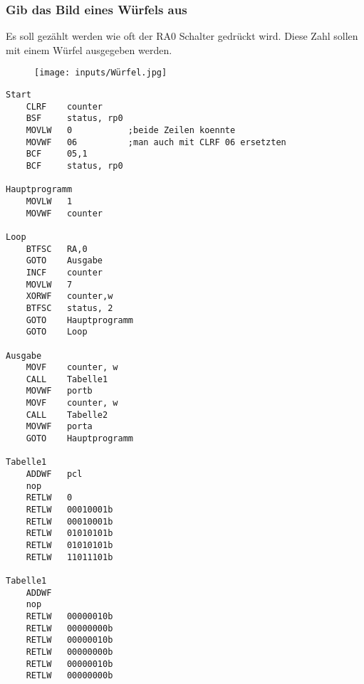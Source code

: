 \subsubsection*{Gib das Bild eines Würfels aus}
Es soll gezählt werden wie oft der RA0 Schalter gedrückt wird. Diese Zahl sollen mit einem Würfel ausgegeben werden.
\begin{figure}[H]
    \centering
    \texttt{[image: inputs/Würfel.jpg]}
\end{figure}
\begin{lstlisting}[language=avr]
Start
    CLRF    counter
    BSF     status, rp0
    MOVLW   0           ;beide Zeilen koennte 
    MOVWF   06          ;man auch mit CLRF 06 ersetzten
    BCF     05,1    
    BCF     status, rp0

Hauptprogramm
    MOVLW   1
    MOVWF   counter

Loop
    BTFSC   RA,0
    GOTO    Ausgabe     
    INCF    counter
    MOVLW   7
    XORWF   counter,w
    BTFSC   status, 2
    GOTO    Hauptprogramm
    GOTO    Loop

Ausgabe
    MOVF    counter, w
    CALL    Tabelle1
    MOVWF   portb
    MOVF    counter, w
    CALL    Tabelle2
    MOVWF   porta
    GOTO    Hauptprogramm

Tabelle1
    ADDWF   pcl
    nop
    RETLW   0
    RETLW   00010001b
    RETLW   00010001b
    RETLW   01010101b
    RETLW   01010101b
    RETLW   11011101b

Tabelle1
    ADDWF   
    nop
    RETLW   00000010b
    RETLW   00000000b
    RETLW   00000010b
    RETLW   00000000b
    RETLW   00000010b
    RETLW   00000000b

  \end{lstlisting}